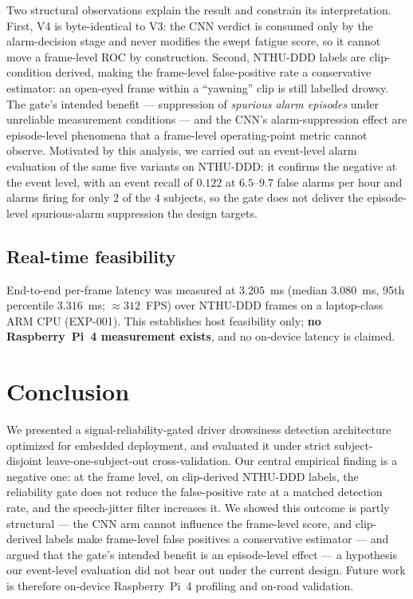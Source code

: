\documentclass[10pt,conference]{IEEEtran}
\begin{document}
Two structural observations explain the result and constrain its
interpretation. First, V4 is byte-identical to V3: the CNN verdict is consumed
only by the alarm-decision stage and never modifies the swept fatigue score, so
it cannot move a frame-level ROC by construction. Second, NTHU-DDD labels are
clip-condition derived, making the frame-level false-positive rate a
conservative estimator: an open-eyed frame within a ``yawning'' clip is still
labelled drowsy. The gate's intended benefit --- suppression of \emph{spurious
alarm episodes} under unreliable measurement conditions --- and the CNN's
alarm-suppression effect are episode-level phenomena that a frame-level
operating-point metric cannot observe. Motivated by this analysis, we carried
out an event-level alarm evaluation of the same five variants on NTHU-DDD: it
confirms the negative at the event level, with an event recall of $0.122$ at
$6.5$--$9.7$ false alarms per hour and alarms firing for only $2$ of the $4$
subjects, so the gate does not deliver the episode-level spurious-alarm
suppression the design targets.

\subsection{Real-time feasibility}
End-to-end per-frame latency was measured at $3.205$~ms (median $3.080$~ms, 95th
percentile $3.316$~ms; $\approx 312$~FPS) over NTHU-DDD frames on a laptop-class
ARM CPU (\mbox{EXP-001}). This establishes host feasibility only; \textbf{no
Raspberry~Pi~4 measurement exists}, and no on-device latency is claimed.

\section{Conclusion}
We presented a signal-reliability-gated driver drowsiness detection
architecture optimized for embedded deployment, and evaluated it under strict
subject-disjoint leave-one-subject-out cross-validation. Our central empirical
finding is a negative one: at the frame level, on clip-derived NTHU-DDD labels,
the reliability gate does not reduce the false-positive rate at a matched
detection rate, and the speech-jitter filter increases it. We showed this
outcome is partly structural --- the CNN arm cannot influence the frame-level
score, and clip-derived labels make frame-level false positives a conservative
estimator --- and argued that the gate's intended benefit is an episode-level
effect --- a hypothesis our event-level evaluation did not bear out under the
current design. Future work is therefore on-device Raspberry~Pi~4 profiling and
on-road validation.


\end{document}
